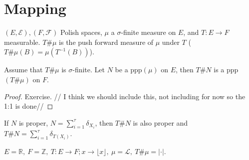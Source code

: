 \section{Mapping}
$(E, \mathcal{E}), (F, \mathcal{F})$ Polish spaces, $\mu$ a $ \sigma$-finite measure on $E$, and $T:E \to F$ measurable. $T\#\mu $ is the push forward measure of $\mu $ under $T$ ($T\#\mu(B)=\mu(T^{-1}(B))$).

\begin{theorem}[]
	Assume that $T\#\mu$ is $\sigma$-finite. Let $N$ be a ppp$(\mu)$ on $E$, then $T\#N$ is a ppp$(T\#\mu)$ on $F$.
\end{theorem}
\begin{proof}
	Exercise. 
	{\color{blue} // I think we should include this, not including for now so the 1:1 is done//}
\end{proof}

\begin{rmk}
	If $N$ is proper, $N=\sum_{i=1}^{\tau} \delta_{X_i}$, then $T\#N$ is also proper and $T\#N = \sum_{i=1}^{\tau} \delta_{T(X_i)}$.
\end{rmk}

\begin{ex}[]
	$E=\mathbb{R},\ F=\mathbb{Z},\ T:E \to F; x \to \lfloor x \rfloor,\ \mu= \mathcal{L},\ T\#\mu=|\cdot |$.
\end{ex}

